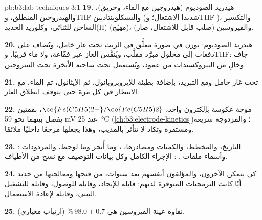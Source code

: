 \begin{solution}{pb:b3:lab-techniques-3:1}
\textbf{19.} هيدريد الصوديوم (هيدروجين مع الماء، وحريق)، والهيدروجين المنطلق، وTHF 
والسيكلوبنتاديين (شديدا الاشتعال؛ وTHF )، والتكسير الساخن
للثنائي، وكلوريد الحديد(II) (مهيّج)، والفيروسين (صلب قابل للاشتعال، ضار).

\textbf{20.} هيدريد الصوديوم: يوزن في صورة معلَّق في الزيت تحت غاز خامل، ويُضاف على
دفعات إلى محلول مبرَّد مقلَّب، ويُنفَّس الغاز عبر فقّاعة، ولا ماء
قريبًا. وTHF: جاف وخالٍ من البيروكسيدات من عمود، ويُستعمل تحت ساحبة الأبخرة تحت النيتروجين.

\textbf{21.} تحت غاز خامل ومع التبريد، بإضافة بطيئة للإيزوبروبانول، ثم
الإيثانول، ثم الماء، مع الانتظار في كل مرة حتى يتوقف انطلاق الغاز.

\textbf{22.} موجة عكوسة بإلكترون واحد، $\ce{Fe(C5H5)2+}/\ce{Fe(C5H5)2}$، بقمتين يفصل بينهما نحو 59 mV عند \qty{25}{\celsius}
(\cref{ch:b3:electrode-kinetics})؛ والمزدوجة سريعة ومستقرة وتكاد لا تتأثر
بالمذيب، وهذا يجعلها مرجعًا داخليًا ملائمًا.

\textbf{23.} : التاريخ، والمخطط، والكميات ومصادرها، ، وما
أُنجز وما لوحظ، والمردودات وأسماء ملفات . : الإجراء الكامل وكل بيانات التوصيف مع نسخ من
الأطياف.

\textbf{24.} كي يتمكن الآخرون، والمؤلفون أنفسهم بعد سنوات، من فتحها ومعالجتها من جديد
أيًا كانت البرمجيات المتوفرة لديهم: قابلة للإيجاد، وقابلة للوصول، وقابلة للتشغيل البيني، وقابلة لإعادة الاستعمال.

\textbf{25.} نقاوة عينة الفيروسين  هي $98.0 \pm 0.7$\,\% (ارتياب معياري).
\end{solution}
